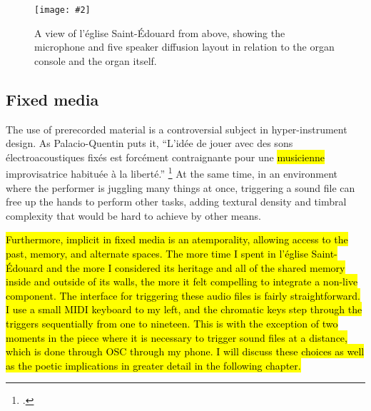 \documentclass[12pt,twoside,maitrise]{dms_ks}
\newcommand{\customincludegraphics}[4][]{%
    \begin{figure}[H]
        \centering
        \texttt{[image: \#2]}
        \caption{#4}
	\label{#3} 
    \end{figure}
}
\theoremstyle{definition}
\begin{document}
{\customincludegraphics[scale=0.75]{stageplot_ste-edouard2}{fig:stageplot}{A view of l'église Saint-Édouard from above, showing the microphone and five speaker diffusion layout in relation to the organ console and the organ itself.}

\subsection{Fixed media}

The use of prerecorded material is a controversial subject in hyper-instrument design.
As Palacio-Quentin puts it, “L’idée de jouer avec des sons électroacoustiques fixés est forcément contraignante pour une \hl{musicienne} improvisatrice habituée à la liberté.” \footcite[50]{palacio-quintin_composition_2012-1}
At the same time, in an environment where the performer is juggling many things at once, triggering a sound file can free up the hands to perform other tasks, adding textural density and timbral complexity that would be hard to achieve by other means. 


\hl{Furthermore, implicit in fixed media is an atemporality, allowing access to the past, memory, and alternate spaces.
The more time I spent in l'église Saint-Édouard and the more I considered its heritage and all of the shared memory inside and outside of its walls, the more it felt compelling to integrate a non-live component.
The interface for triggering these audio files is fairly straightforward.
I use a small MIDI keyboard to my left, and the chromatic keys step through the triggers sequentially from one to nineteen. 
This is with the exception of two moments in the piece where it is necessary to trigger sound files at a distance, which is done through OSC through my phone.
I will discuss these choices as well as the poetic implications in greater detail in the following chapter.}



}
\end{document}
